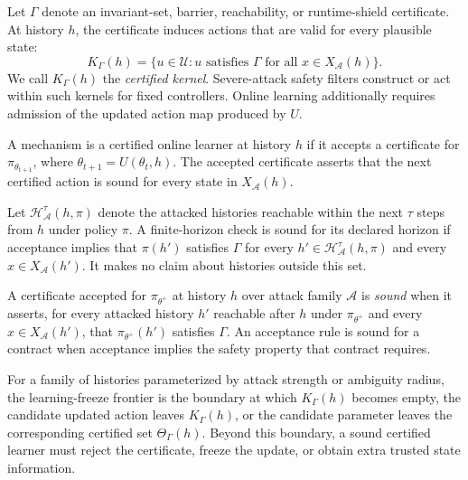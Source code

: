 Let $\Gamma$ denote an invariant-set, barrier, reachability, or runtime-shield
certificate.  At history $h$, the certificate induces actions that are valid
for every plausible state:
\begin{equation}
    K_\Gamma(h)=\{u\in\mathcal U: u \text{ satisfies } \Gamma \text{ for all } x\in X_{\mathcal A}(h)\}.
\end{equation}
We call $K_\Gamma(h)$ the \emph{certified kernel}.  Severe-attack safety
filters construct or act within such kernels for fixed controllers.  Online
learning additionally requires admission of the updated action map produced by
$U$.

\begin{definition}
A mechanism is a certified online learner at history $h$ if it accepts a
certificate for $\pi_{\theta_{t+1}}$, where
$\theta_{t+1}=U(\theta_t,h)$.  The accepted certificate asserts that the next
certified action is sound for every state in $X_{\mathcal A}(h)$.
\end{definition}

\begin{definition}
Let $\mathcal H_{\mathcal A}^{\tau}(h,\pi)$ denote the attacked histories
reachable within the next $\tau$ steps from $h$ under policy $\pi$.  A
finite-horizon check is sound for its declared horizon if acceptance implies
that $\pi(h')$ satisfies $\Gamma$ for every
$h'\in\mathcal H_{\mathcal A}^{\tau}(h,\pi)$ and every
$x\in X_{\mathcal A}(h')$.  It makes no claim about histories outside this
set.
\end{definition}

\begin{definition}
A certificate accepted for $\pi_{\theta^+}$ at history $h$ over attack family
$\mathcal A$ is \emph{sound} when it asserts, for every attacked history $h'$
reachable after $h$ under $\pi_{\theta^+}$ and every $x\in X_{\mathcal A}(h')$,
that $\pi_{\theta^+}(h')$ satisfies $\Gamma$.  An acceptance rule is sound for
a contract when acceptance implies the safety property that contract requires.
\end{definition}

\begin{definition}
For a family of histories parameterized by attack strength or ambiguity
radius, the learning-freeze frontier is the boundary at which
$K_\Gamma(h)$ becomes empty, the candidate updated action leaves
$K_\Gamma(h)$, or the candidate parameter leaves the corresponding certified
set $\Theta_\Gamma(h)$. Beyond this boundary, a sound certified learner must
reject the certificate, freeze the update, or obtain extra trusted state
information.
\end{definition}

